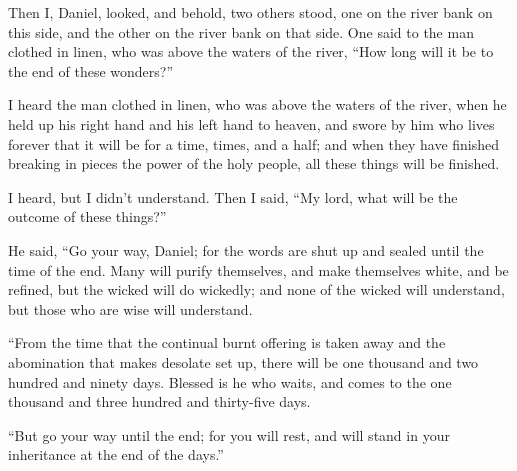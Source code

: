  Then I, Daniel, looked, and behold, two others stood, one
on the river bank on this side, and the other on the river bank on that
side.  One said to the man clothed in linen, who was above
the waters of the river, ``How long will it be to the end of these
wonders?''

 I heard the man clothed in linen, who was above the waters
of the river, when he held up his right hand and his left hand to
heaven, and swore by him who lives forever that it will be for a time,
times, and a half; and when they have finished breaking in pieces the
power of the holy people, all these things will be finished.

 I heard, but I didn't understand. Then I said, ``My lord,
what will be the outcome of these things?''

 He said, ``Go your way, Daniel; for the words are shut up
and sealed until the time of the end.  Many will purify
themselves, and make themselves white, and be refined, but the wicked
will do wickedly; and none of the wicked will understand, but those who
are wise will understand.

 ``From the time that the continual burnt offering is taken
away and the abomination that makes desolate set up, there will be one
thousand and two hundred and ninety days.  Blessed is he
who waits, and comes to the one thousand and three hundred and
thirty-five days.

 ``But go your way until the end; for you will rest, and
will stand in your inheritance at the end of the days.''
